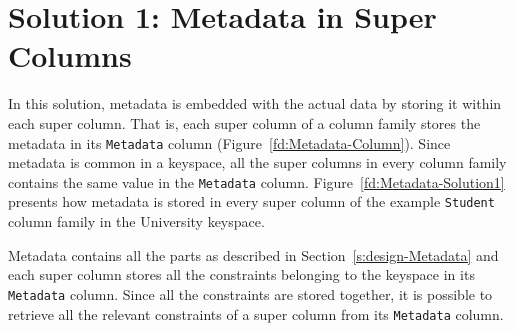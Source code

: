 
\section{Solution 1:  Metadata in Super Columns} \label{s:design-sol1}

In this  solution,   metadata is embedded with the actual data by storing it
within each super column. That is, each super column of a column family stores
the metadata in its  \texttt{Metadata} column (Figure~\ref{fd:Metadata-Column}).
Since metadata is common in a keyspace, all the super columns in every column
family contains the same  value in the \texttt{Metadata} column.
Figure~\ref{fd:Metadata-Solution1} presents how metadata is stored in every
super column of the example \texttt{Student} column family in the University
keyspace.

Metadata contains all the parts as
described in Section~\ref{s:design-Metadata} and each super column stores all
the constraints belonging to the keyspace in its \texttt{Metadata} column. Since
all the constraints are stored together, it is possible to retrieve all the
relevant constraints of a super column from its \texttt{Metadata} column.
		

